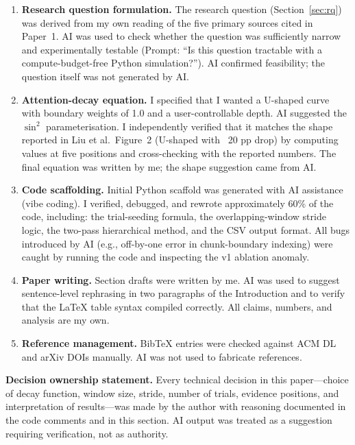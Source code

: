 \documentclass[sigconf,nonacm]{acmart}
\begin{document}
\begin{enumerate}
  \item \textbf{Research question formulation.}
    The research question (Section~\ref{sec:rq}) was derived from my own reading
    of the five primary sources cited in Paper~1.
    AI was used to check whether the question was sufficiently narrow and
    experimentally testable (Prompt: ``Is this question tractable with a
    compute-budget-free Python simulation?'').
    AI confirmed feasibility; the question itself was not generated by AI.

  \item \textbf{Attention-decay equation.}
    I specified that I wanted a U-shaped curve with boundary weights of 1.0 and
    a user-controllable depth.
    AI suggested the $\sin^2$ parameterisation.
    I independently verified that it matches the shape reported in Liu et al.\
    Figure~2 (U-shaped with ~20 pp drop) by computing values at five positions
    and cross-checking with the reported numbers.
    The final equation was written by me; the shape suggestion came from AI.

  \item \textbf{Code scaffolding.}
    Initial Python scaffold was generated with AI assistance (vibe coding).
    I verified, debugged, and rewrote approximately 60\% of the code, including:
    the trial-seeding formula, the overlapping-window stride logic, the two-pass
    hierarchical method, and the CSV output format.
    All bugs introduced by AI (e.g., off-by-one error in chunk-boundary indexing)
    were caught by running the code and inspecting the v1 ablation anomaly.

  \item \textbf{Paper writing.}
    Section drafts were written by me.
    AI was used to suggest sentence-level rephrasing in two paragraphs of the
    Introduction and to verify that the LaTeX table syntax compiled correctly.
    All claims, numbers, and analysis are my own.

  \item \textbf{Reference management.}
    BibTeX entries were checked against ACM DL and arXiv DOIs manually.
    AI was not used to fabricate references.
\end{enumerate}

\noindent\textbf{Decision ownership statement.}
Every technical decision in this paper—choice of decay function, window size,
stride, number of trials, evidence positions, and interpretation of results—was
made by the author with reasoning documented in the code comments and in this
section.
AI output was treated as a suggestion requiring verification, not as authority.
\end{document}
